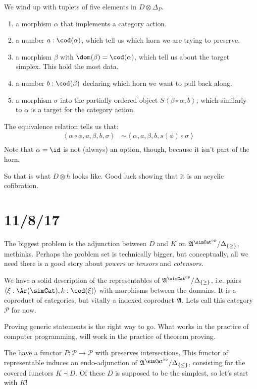 \documentclass{tac}
\newcommand\cat\mathcal
\newcommand\set[1]{\left\{#1\right\}}
\newcommand\dual{^{\mathrm{op}}}
\newcommand\s{^{\simCat\dual}}
\newcommand\of{:}
\newcommand\simplex\Delta
\newcommand\tuplet[1]{\left\langle #1 \right\rangle}
\newcommand\ambient{\mathfrak A}
\begin{document}
We wind up with tuplets of five elements in $D\otimes \simplex_P$.
\begin{enumerate}
\item a morphism $\alpha$ that implements a category action.
\item a number $a\of\cod(\alpha)$, which tell us which horn we are trying to preserve.
\item a morphism $\beta$ with $\dom(\beta) = \cod(\alpha)$, which tell us about the target simplex. This hold the most data.
\item a number $b\of \cod(\beta)$ declaring which horn we want to pull back along.
\item a morphism $\sigma$ into the partially ordered object $S\tuplet{\beta\circ \alpha,b}$, which similarly to $\alpha$ is a target for the category action.
\end{enumerate}
The equivalence relation tells us that:
\begin{align*}
\tuplet{\alpha\circ\phi,a,\beta,b,\sigma}&\sim
\tuplet{\alpha,a,\beta,b,s(\phi)\circ\sigma}\\
\end{align*}
Note that $\alpha=\id$ is not (always) an option, though, because it isn't part of the horn.

So that is what $D\otimes h$ looks like. Good luck showing that it is an acyclic cofibration.

\section{11/8/17}
The biggest problem is the adjunction between $D$ and $K$ on $\ambient\s/\simplex_{\set\geq}$, methinks.
Perhaps the problem set is technically bigger, but conceptually, all we need there is a good story about \emph{powers} or \emph{tensors} and \emph{cotensors}.

We have a solid description of the representables of $\ambient\s/\simplex_{\set\geq}$, i.e. pairs $\tuplet{\xi\of\Ar(\simCat),k\of \cod(\xi)}$ with morphisms between the domains. It is a coproduct of categories, but vitally a indexed coproduct $\ambient$. Lets call this category $\cat P$ for now.

Proving generic statements is the right way to go. What works in the practice of computer programming, will work in the practice of theorem proving.

The have a functor $P\of \cat P\to\cat P$ with preserves intersections. This functor of representable induces an endo-adjunction of $\ambient\s/\simplex_{\set\leq}$, consisting for the covered functors $K\dashv D$. Of these $D$ is supposed to be the simplest, so let's start with $K$!
\end{document}
